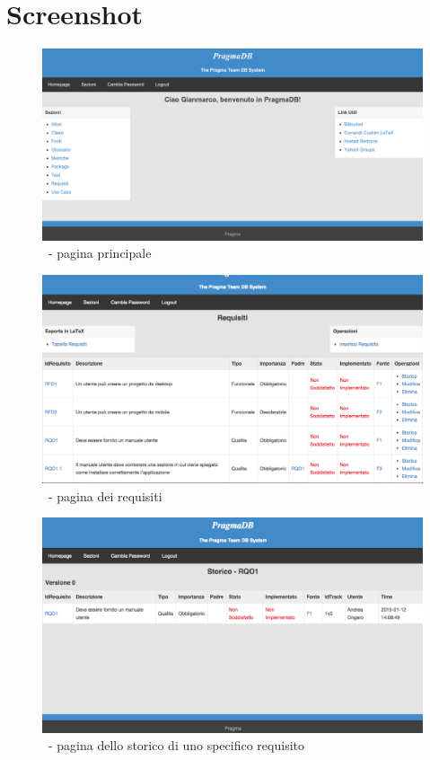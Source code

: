 \section{Screenshot \pragmadb}\label{screenPDB}
\begin{figure}[h]
\centering
\includegraphics[width=\textwidth,keepaspectratio]{../immagini/home.png}
\caption{\pragmadb\ - pagina principale}\label{fig: PDBHome}
\end{figure}
\begin{figure}[h]
\centering
\includegraphics[width=\textwidth,keepaspectratio]{../immagini/requisiti.png}
\caption{\pragmadb\ - pagina dei requisiti}\label{fig: PDBRequisiti}
\end{figure}
\begin{figure}[h]
\centering
\includegraphics[width=\textwidth,keepaspectratio]{../immagini/history.png}
\caption{\pragmadb\ - pagina dello storico di uno specifico requisito}\label{fig: PDBHistory}
\end{figure}
